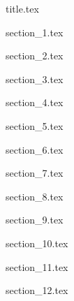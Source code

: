 \documentclass[11pt, a4paper, oneside, onecolumn, titlepage]{article}
\begin{document}
{title.tex}
\tableofcontents

\pagebreak
\listoftables

\pagebreak
\listoffigures

\pagebreak
\listoflistings

\pagebreak
{section_1.tex}

\pagebreak
{section_2.tex}

\pagebreak
{section_3.tex}

\pagebreak
{section_4.tex}

\pagebreak
{section_5.tex}

\pagebreak
{section_6.tex}

\pagebreak
{section_7.tex}

\pagebreak
{section_8.tex}

\pagebreak
{section_9.tex}

\pagebreak
{section_10.tex}

\pagebreak
{section_11.tex}

\pagebreak
{section_12.tex}

\end{document}

